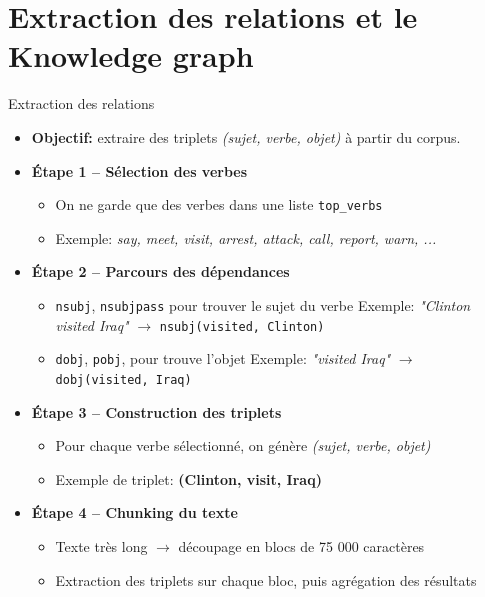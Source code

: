 \documentclass[10pt]{beamer}
\begin{document}
\section{Extraction des relations et le Knowledge graph}

\begin{frame}{Extraction des relations}
    \vspace{-0.4cm}
    \begin{itemize}
        \item \textbf{Objectif:} extraire des triplets \textit{(sujet, verbe, objet)} à partir du corpus.
        
        \item \textbf{Étape 1 – Sélection des verbes}
        \begin{itemize}
            \item On ne garde que des verbes dans une liste \texttt{top\_verbs}
            \item Exemple: \textit{say, meet, visit, arrest, attack, call, report, warn, ...}
        \end{itemize}
        
        \item \textbf{Étape 2 – Parcours des dépendances}
        \begin{itemize}
            \item \texttt{nsubj}, \texttt{nsubjpass} pour trouver le sujet du verbe  
                  Exemple: \textit{"Clinton visited Iraq"} $\rightarrow$ \texttt{nsubj(visited, Clinton)}
            \item \texttt{dobj}, \texttt{pobj}, pour trouve l’objet  
                  Exemple: \textit{"visited Iraq"} $\rightarrow$ \texttt{dobj(visited, Iraq)}
        \end{itemize}
        
        \item \textbf{Étape 3 – Construction des triplets}
        \begin{itemize}
            \item Pour chaque verbe sélectionné, on génère \textit{(sujet, verbe, objet)}
            \item Exemple de triplet: \textbf{(Clinton, visit, Iraq)}
        \end{itemize}
        
        \item \textbf{Étape 4 – Chunking du texte}
        \begin{itemize}
            \item Texte très long $\rightarrow$ découpage en blocs de 75 000 caractères
            \item Extraction des triplets sur chaque bloc, puis agrégation des résultats
        \end{itemize}
        
    \end{itemize}
\end{frame}
\end{document}
